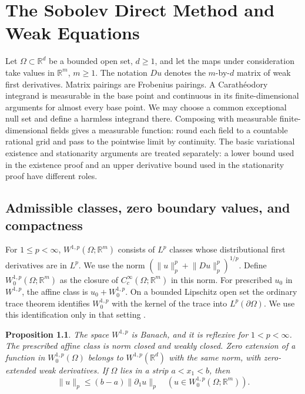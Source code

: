 \documentclass[11pt,oneside,openany]{book}
\newcommand{\R}{\mathbb R}
\newcommand{\norm}[1]{\lVert #1\rVert}
\theoremstyle{plain}
\newtheorem{proposition}[theorem]{Proposition}
\theoremstyle{definition}
\theoremstyle{remark}
\begin{document}
\chapter{The Sobolev Direct Method and Weak Equations}
\label{chap:sobolev-direct}

Let \(\Omega\subset\R^d\) be a bounded open set, \(d\ge1\), and
let the maps under consideration take values in \(\R^m\), \(m\ge1\).
The notation \(Du\) denotes the \(m\)-by-\(d\) matrix of weak first
derivatives. Matrix pairings are Frobenius pairings. A Carath\'eodory
integrand is measurable in the base point and continuous in its
finite-dimensional arguments for almost every base point. We may
choose a common exceptional null set and define a harmless
integrand there. Composing with measurable finite-dimensional
fields gives a measurable function: round each field to a
countable rational grid and pass to the pointwise limit by
continuity. The basic variational existence and stationarity
arguments are treated separately: a lower bound used in the
existence proof and an upper derivative bound used in the
stationarity proof have different roles.

\section{Admissible classes, zero boundary values, and compactness}
\label{v08-01}

For \(1\le p<\infty\), \(W^{1,p}(\Omega;\R^m)\) consists of \(L^p\)
classes whose distributional first derivatives are in \(L^p\).
We use the norm \((\norm{u}_p^p+\norm{Du}_p^p)^{1/p}\).
Define \(W^{1,p}_0(\Omega;\R^m)\) as the closure of
\(C^\infty_c(\Omega;\R^m)\) in this norm. For prescribed \(u_0\) in
\(W^{1,p}\), the affine class is \(u_0+W^{1,p}_0\). On a bounded
Lipschitz open set the ordinary trace theorem identifies
\(W^{1,p}_0\) with the kernel of the trace into \(L^p(\partial\Omega)\).
We use this identification only in that setting
\cite[Chapter 9]{Brezis}\cite[Unit U5, ordinary trace theorem]{MathGenomeP102}.

\begin{proposition}\label{prop:sobolev-affine}
The space \(W^{1,p}\) is Banach, and it is reflexive for \(1<p<\infty\).
The prescribed affine class is norm closed and weakly closed.
Zero extension of a function in \(W^{1,p}_0(\Omega)\) belongs to
\(W^{1,p}(\R^d)\) with the same norm, with zero-extended weak derivatives.
If \(\Omega\) lies in a strip \(a<x_1<b\), then
\[
 \norm{u}_p\le (b-a)\norm{\partial_1u}_p
 \quad (u\in W^{1,p}_0(\Omega;\R^m)).
\]
\end{proposition}
\end{document}
